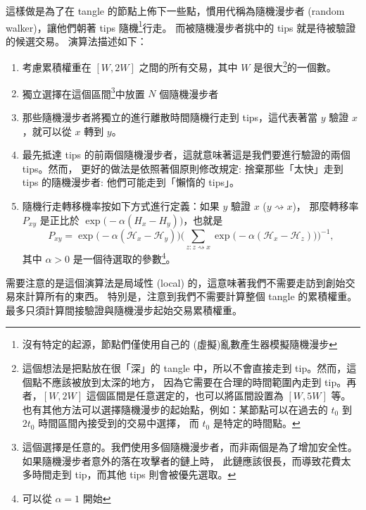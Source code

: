 \documentclass[12pt]{article}
\newcommand{\HH}{\mathcal{H}}
\begin{document}
\begin{CJK}{UTF8}{bkai}
這樣做是為了在 tangle 的節點上佈下一些點，慣用代稱為隨機漫步者 (random walker)，讓他們朝著 tips 隨機\footnote{
沒有特定的起源，節點們僅使用自己的 (虛擬)亂數產生器模擬隨機漫步}行走。
而被隨機漫步者挑中的 tips 就是待被驗證的候選交易。
演算法描述如下：
\begin{enumerate}
 \item 考慮累積權重在 $[W,2W]$ 之間的所有交易，其中 $W$ 是很大\footnote{
 這個想法是把點放在很「深」的 tangle 中，所以不會直接走到 tip。然而，這個點不應該被放到太深的地方，
 因為它需要在合理的時間範圍內走到 tip。再者，$[W,2W]$ 這個區間是任意選定的，也可以將區間設置為 $[W,5W]$ 等。
也有其他方法可以選擇隨機漫步的起始點，例如：某節點可以在過去的 $t_0$ 到 $2t_0$ 時間區間內接受到的交易中選擇，
而 $t_0$ 是特定的時間點。}的一個數。
 \item 獨立選擇在這個區間\footnote{
   這個選擇是任意的。我們使用多個隨機漫步者，而非兩個是為了增加安全性。如果隨機漫步者意外的落在攻擊者的鏈上時，
   此鏈應該很長，而導致花費太多時間走到 tip，而其他 tips 則會被優先選取。}中放置 $N$ 個隨機漫步者
 \item 
 那些隨機漫步者將獨立的進行離散時間隨機行走到 tips，這代表著當 $y$ 驗證 $x$，就可以從 $x$ 轉到 $y$。
 \item 最先抵達 tips 的前兩個隨機漫步者，這就意味著這是我們要進行驗證的兩個tips。然而，
 更好的做法是依照著個原則修改規定: 捨棄那些「太快」走到 tips 的隨機漫步者: 
 他們可能走到「懶惰的 tips」。
 \item 隨機行走轉移機率按如下方式進行定義：如果 $y$ 驗證 $x$ ($y\rightsquigarrow x$)，
  那麼轉移率 $P_{xy}$ 是正比於 $\exp\big(-\alpha(H_x-H_y)\big)$，也就是
 \begin{equation}
  \label{trans_probs}
   P_{xy} = \exp\big(-\alpha(\HH_x-\HH_y)\big)
\Big(\sum_{z: z \rightsquigarrow x}
 \exp\big(-\alpha(\HH_x-\HH_z)\big)\Big)^{-1},
 \end{equation}
 其中 $\alpha>0$ 是一個待選取的參數\footnote{可以從 $\alpha=1$ 開始}。
\end{enumerate}
需要注意的是這個演算法是局域性 (local) 的，這意味著我們不需要走訪到創始交易來計算所有的東西。
特別是，注意到我們不需要計算整個 tangle 的累積權重。最多只須計算間接驗證與隨機漫步起始交易累積權重。


\end{CJK}
\end{document}

